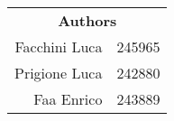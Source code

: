 \documentclass[twoside, a4paper, 10pt]{report}
\newcommand\blankpage{%
    \null
    \thispagestyle{empty}%
    \newpage}
\begin{document}
\begin{titlepage}
\begin{center}
        \end{center}
        \vspace{1.5in}
        \vfill
        \begin{flushright}
            \rightskip=2cm
            \begin{tabular}{r l}
                \multicolumn{2}{c}{\textbf{Authors}} \\
                Facchini Luca & 245965 \\
                Prigione Luca & 242880 \\
                Faa Enrico & 243889
            \end{tabular}
        \end{flushright}
        \vfill
    \end{titlepage}
    \begingroup
        \setcounter{tocdepth}{0}
        \tableofcontents
        \thispagestyle{index}
    \endgroup
    \pagestyle{stdPage}
    \newpage
    
    
    
    
    
    
\end{document}
